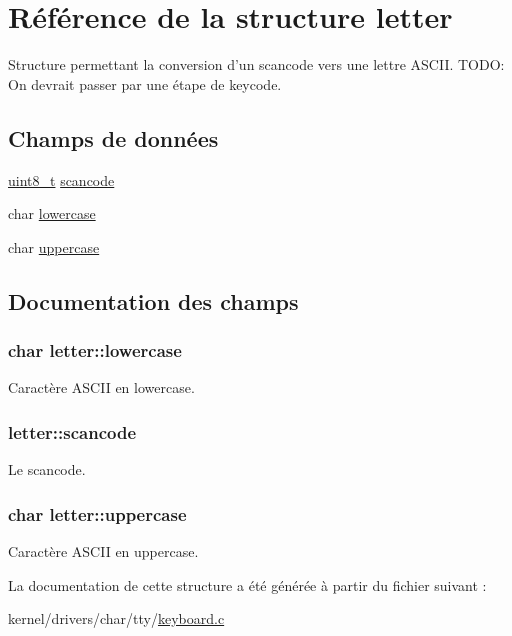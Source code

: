 \hypertarget{structletter}{\section{Référence de la structure letter}
\label{structletter}
}


Structure permettant la conversion d'un scancode vers une lettre A\-S\-C\-I\-I. T\-O\-D\-O\-: On devrait passer par une étape de keycode.  


\subsection*{Champs de données}
\begin{DoxyCompactItemize}
\item 
\hyperlink{kernel_2include_2types_8h_aba7bc1797add20fe3efdf37ced1182c5}{uint8\-\_\-t} \hyperlink{structletter_a81ce8d7b41dfa934b919f660bea2b52b}{scancode}
\item 
char \hyperlink{structletter_af4289f944a89553b8145286331ca3bdd}{lowercase}
\item 
char \hyperlink{structletter_abcf4b11624e2497e2d5798a805002268}{uppercase}
\end{DoxyCompactItemize}


\subsection{Documentation des champs}
\hypertarget{structletter_af4289f944a89553b8145286331ca3bdd}{
\subsubsection[{lowercase}]{\setlength{\rightskip}{0pt plus 5cm}char letter\-::lowercase}}\label{structletter_af4289f944a89553b8145286331ca3bdd}
Caractère A\-S\-C\-I\-I en lowercase. \hypertarget{structletter_a81ce8d7b41dfa934b919f660bea2b52b}{
\subsubsection[{scancode}]{ letter\-::scancode}}\label{structletter_a81ce8d7b41dfa934b919f660bea2b52b}
Le scancode. \hypertarget{structletter_abcf4b11624e2497e2d5798a805002268}{
\subsubsection[{uppercase}]{\setlength{\rightskip}{0pt plus 5cm}char letter\-::uppercase}}\label{structletter_abcf4b11624e2497e2d5798a805002268}
Caractère A\-S\-C\-I\-I en uppercase. 

La documentation de cette structure a été générée à partir du fichier suivant \-:\begin{DoxyCompactItemize}
\item 
kernel/drivers/char/tty/\hyperlink{keyboard_8c}{keyboard.\-c}\end{DoxyCompactItemize}
